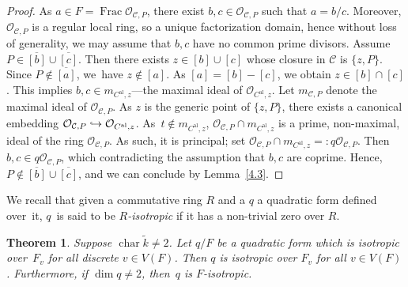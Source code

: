 \documentclass[10pt]{amsart}
\newcommand{\hto}{\mathrel{\lhook\joinrel\to}}
\newcommand{\al}{\mathrm{al}}
\DeclareMathOperator{\Char}{char}
\DeclareMathOperator{\Frac}{Frac}
\newtheorem{thm}{Theorem}[section]
\theoremstyle{definition}
\begin{document}
\begin{proof}
As $a \in F=\Frac \mathcal{O}_{\mathcal{C}, P}$, there exist $b, c \in \mathcal{O}_{\mathcal{C}, P}$ such that $a=b/c$. Moreover, $\mathcal{O}_{\mathcal{C}, P}$ is a regular local ring, so a unique factorization domain, hence without loss of generality, we may assume that $b,c$ have no common prime divisors. Assume \hbox{$P \in \overline{[b]} \cup \overline{[c]}$}. Then there exists $z \in [b] \cup [c]$ whose closure in $\mathcal{C}$ is $\{z, P\}$. Since $P \not \in \overline{[a]}$, we~have $z \not \in [a]$. As $[a]=[b]-[c]$, we obtain $z \in [b] \cap [c]$. This implies $b, c \in m_{C^{\al},z}$---the maximal ideal of $\mathcal{O}_{C^{\al},z}$. Let $m_{\mathcal{C},P}$ denote the maximal ideal of $\mathcal{O}_{\mathcal{C}, P}$. As $z$ is the generic point of $\{z, P\}$, there exists a canonical embedding $\mathcal{O}_{\mathcal{C}, P} \hto \mathcal{O}_{C^{\al},z}$. As~$t \not \in m_{C^{\al},z}$, $\mathcal{O}_{\mathcal{C}, P} \cap m_{C^{\al},z}$ is a prime, non-maximal, ideal of the ring $\mathcal{O}_{\mathcal{C}, P}$. As such, it is principal; set $\mathcal{O}_{\mathcal{C}, P} \cap m_{C^{\al},z} =:q \mathcal{O}_{\mathcal{C}, P}$. Then $b,c \in q \mathcal{O}_{\mathcal{C}, P}$, which contradicting the assumption that $b,c$ are coprime.
Hence, $P \not \in \overline{[b]} \cup \overline{[c]}$, and we can conclude by Lemma~\ref{4.3}.
\end{proof}

We recall that given a commutative ring $R$ and a $q$ a quadratic form defined over~it, $q$~is said to be \emph{$R$-isotropic} if it has a non-trivial zero over $R$.

\begin{thm} \label{4.5}
Suppose $\Char \widetilde{k} \neq 2$. Let $q/F$ be a quadratic form which is isotropic over~$F_v$ for all \emph{discrete} $v \in V(F)$. Then $q$ is isotropic over $F_v$ for \emph{all} $v \in V(F)$. Furthermore, if $\dim{q} \neq 2$, then~$q$ is $F$-isotropic.
\end{thm}
\end{document}
